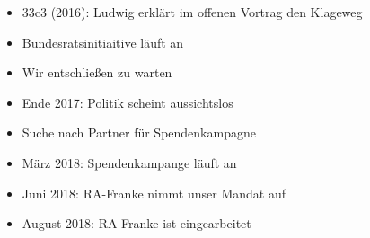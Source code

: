 \begin{frame}
    \begin{itemize}
        \item 33c3 (2016): Ludwig erklärt im offenen Vortrag den Klageweg
        \item Bundesratsinitiaitive läuft an
        \item Wir entschließen zu warten
        \item Ende 2017: Politik scheint aussichtslos
        \item Suche nach Partner für Spendenkampagne
        \item März 2018: Spendenkampange läuft an
        \item Juni 2018: RA-Franke nimmt unser Mandat auf
        \item August 2018: RA-Franke ist eingearbeitet
    \end{itemize}
\end{frame}

